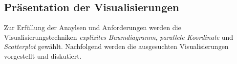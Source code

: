 \documentclass[usegeometry=true]{scrartcl}
\begin{document}

\subsection{Präsentation der Visualisierungen}
Zur Erfüllung der Anaylsen und Anforderungen werden die Visualisierungstechniken \textit{explizites Baumdiagramm}, \textit{parallele Koordinate} und \textit{Scatterplot} gewählt.
Nachfolgend werden die ausgesuchten Visualisierungen vorgestellt und diskutiert. 
\end{document}
